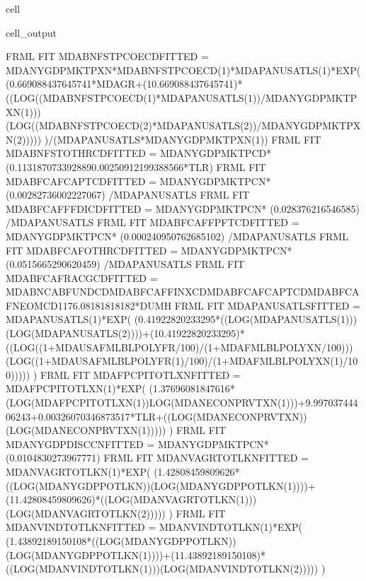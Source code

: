 \documentclass[letterpaper,10pt,english]{jupyterBook}
\begin{document}
\begin{sphinxuseclass}{cell}
\begin{sphinxVerbatimOutput}
\begin{sphinxuseclass}{cell_output}
\begin{sphinxVerbatim}[commandchars=\\\{\}]
FRML \PYGZlt{}FIT\PYGZgt{} MDABNFSTPCOECD\PYGZus{}FITTED = MDANYGDPMKTPXN*MDABNFSTPCOECD(\PYGZhy{}1)*MDAPANUSATLS(\PYGZhy{}1)*EXP( (0.669088437645741*MDAGR+(1\PYGZhy{}0.669088437645741)*((LOG((MDABNFSTPCOECD(\PYGZhy{}1)*MDAPANUSATLS(\PYGZhy{}1))/MDANYGDPMKTPXN(\PYGZhy{}1)))\PYGZhy{}(LOG((MDABNFSTPCOECD(\PYGZhy{}2)*MDAPANUSATLS(\PYGZhy{}2))/MDANYGDPMKTPXN(\PYGZhy{}2))))) )/(MDAPANUSATLS*MDANYGDPMKTPXN(\PYGZhy{}1)) \PYGZdl{}
FRML \PYGZlt{}FIT\PYGZgt{} MDABNFSTOTHRCD\PYGZus{}FITTED = MDANYGDPMKTPCD* (0.113187073392889\PYGZhy{}0.00250912199388566*T\PYGZus{}LR)  \PYGZdl{}
FRML \PYGZlt{}FIT\PYGZgt{} MDABFCAFCAPTCD\PYGZus{}FITTED = MDANYGDPMKTPCN* (0.00282736002227067) /MDAPANUSATLS \PYGZdl{}
FRML \PYGZlt{}FIT\PYGZgt{} MDABFCAFFFDICD\PYGZus{}FITTED = MDANYGDPMKTPCN* (\PYGZhy{}0.028376216546585) /MDAPANUSATLS \PYGZdl{}
FRML \PYGZlt{}FIT\PYGZgt{} MDABFCAFFPFTCD\PYGZus{}FITTED = MDANYGDPMKTPCN* (\PYGZhy{}0.000240950762685102) /MDAPANUSATLS \PYGZdl{}
FRML \PYGZlt{}FIT\PYGZgt{} MDABFCAFOTHRCD\PYGZus{}FITTED = MDANYGDPMKTPCN* (\PYGZhy{}0.0515665290620459) /MDAPANUSATLS \PYGZdl{}
FRML \PYGZlt{}FIT\PYGZgt{} MDABFCAFRACGCD\PYGZus{}FITTED = \PYGZhy{}MDABNCABFUNDCD\PYGZhy{}MDABFCAFFINXCD\PYGZhy{}MDABFCAFCAPTCD\PYGZhy{}MDABFCAFNEOMCD\PYGZhy{}1176.08181818182*DUMH \PYGZdl{}
FRML \PYGZlt{}FIT\PYGZgt{} MDAPANUSATLS\PYGZus{}FITTED = MDAPANUSATLS(\PYGZhy{}1)*EXP( (0.41922820233295*((LOG(MDAPANUSATLS(\PYGZhy{}1)))\PYGZhy{}(LOG(MDAPANUSATLS(\PYGZhy{}2))))+(1\PYGZhy{}0.41922820233295)*((LOG((1+MDAUSAFMLBLPOLYFR/100)/(1+MDAFMLBLPOLYXN/100)))\PYGZhy{}(LOG((1+MDAUSAFMLBLPOLYFR(\PYGZhy{}1)/100)/(1+MDAFMLBLPOLYXN(\PYGZhy{}1)/100))))) ) \PYGZdl{}
FRML \PYGZlt{}FIT\PYGZgt{} MDAFPCPITOTLXN\PYGZus{}FITTED = MDAFPCPITOTLXN(\PYGZhy{}1)*EXP( (\PYGZhy{}1.37696081847616*(LOG(MDAFPCPITOTLXN(\PYGZhy{}1))\PYGZhy{}LOG(MDANECONPRVTXN(\PYGZhy{}1)))+9.99703744406243+0.00326070346873517*T\PYGZus{}LR+((LOG(MDANECONPRVTXN))\PYGZhy{}(LOG(MDANECONPRVTXN(\PYGZhy{}1))))) ) \PYGZdl{}
FRML \PYGZlt{}FIT\PYGZgt{} MDANYGDPDISCCN\PYGZus{}FITTED = MDANYGDPMKTPCN* (\PYGZhy{}0.0104830273967771)  \PYGZdl{}
FRML \PYGZlt{}FIT\PYGZgt{} MDANVAGRTOTLKN\PYGZus{}FITTED = MDANVAGRTOTLKN(\PYGZhy{}1)*EXP( (1.42808459809626*((LOG(MDANYGDPPOTLKN))\PYGZhy{}(LOG(MDANYGDPPOTLKN(\PYGZhy{}1))))+(1\PYGZhy{}1.42808459809626)*((LOG(MDANVAGRTOTLKN(\PYGZhy{}1)))\PYGZhy{}(LOG(MDANVAGRTOTLKN(\PYGZhy{}2))))) ) \PYGZdl{}
FRML \PYGZlt{}FIT\PYGZgt{} MDANVINDTOTLKN\PYGZus{}FITTED = MDANVINDTOTLKN(\PYGZhy{}1)*EXP( (1.43892189150108*((LOG(MDANYGDPPOTLKN))\PYGZhy{}(LOG(MDANYGDPPOTLKN(\PYGZhy{}1))))+(1\PYGZhy{}1.43892189150108)*((LOG(MDANVINDTOTLKN(\PYGZhy{}1)))\PYGZhy{}(LOG(MDANVINDTOTLKN(\PYGZhy{}2))))) ) \PYGZdl{}

\end{sphinxVerbatim}
\end{sphinxuseclass}
\end{sphinxVerbatimOutput}
\end{sphinxuseclass}
\end{document}
